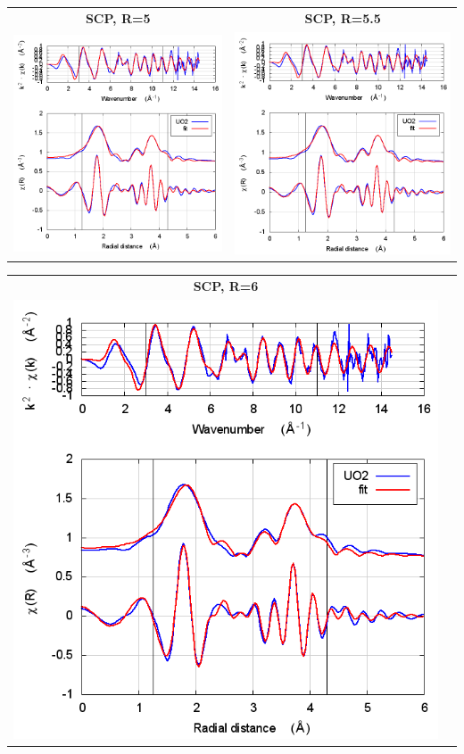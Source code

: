 \documentclass[11pt]{article}
\begin{document}
\begin{center}
  \begin{tabular}{cc}
    \textbf{SCP, R=5} & \textbf{SCP, R=5.5} \\ 
    \includegraphics[width=.45\linewidth]{UO2/scf/fit_withSCF_5.png} & 
    \includegraphics[width=.45\linewidth]{UO2/scf/fit_withSCF_5.5.png} \\
  \end{tabular}
\end{center}
\begin{center}
  \begin{tabular}{cc}
    \textbf{SCP, R=6}&\\
    \includegraphics[width=.45\linewidth]{UO2/scf/fit_withSCF_6.png}&\\
  \end{tabular}
\end{center}
\end{document}
